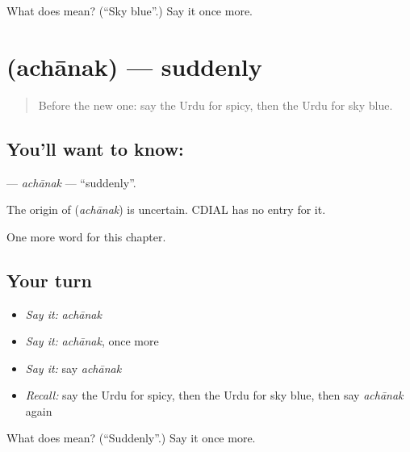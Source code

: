 \begin{tcolorbox}[breakable,colback=teal!4,colframe=teal!35!black,title={Before you move on}]
What does  mean? (\textquotedblleft{}Sky blue\textquotedblright{}.) Say it once more.
\end{tcolorbox}
\section[\texorpdfstring{\ur{اچانک} (achānak)}{اچانک (achānak)}]{ (achānak) — suddenly}

\label{lesson:UR-C195-achanak}



\begin{quote}
Before the new one: say the Urdu for spicy, then the Urdu for sky blue.
\end{quote}

\subsection*{You'll want to know: }
\textbf{} — \emph{achānak} — \textquotedblleft{}suddenly\textquotedblright{}.

\begin{cousinweb}
The origin of \textbf{} (\emph{achānak}) is uncertain. CDIAL has no entry for it.
\end{cousinweb}

\begin{grammarlens}[title={What you've built}]
One more word for this chapter.
\end{grammarlens}

\subsection*{Your turn}
\begin{itemize}
\raggedright
  \item \emph{Say it:} \emph{achānak}
  \item \emph{Say it:} \emph{achānak}, once more
  \item \emph{Say it:} say \emph{achānak}
  \item \emph{Recall:} say the Urdu for spicy, then the Urdu for sky blue, then say \emph{achānak} again
\end{itemize}

\begin{tcolorbox}[breakable,colback=teal!4,colframe=teal!35!black,title={Before you move on}]
What does  mean? (\textquotedblleft{}Suddenly\textquotedblright{}.) Say it once more.
\end{tcolorbox}
